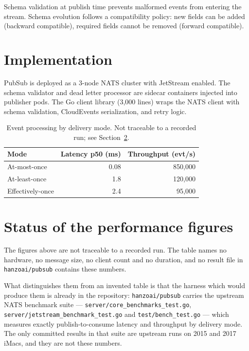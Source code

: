\documentclass[11pt,twocolumn]{article}
\begin{document}
Schema validation at publish time prevents malformed events from entering the stream. Schema evolution follows a compatibility policy: new fields can be added (backward compatible), required fields cannot be removed (forward compatible).

\section{Implementation}

PubSub is deployed as a 3-node NATS cluster with JetStream enabled. The schema validator and dead letter processor are sidecar containers injected into publisher pods. The Go client library (3,000 lines) wraps the NATS client with schema validation, CloudEvents serialization, and retry logic.

\begin{table}[h]
\centering
\caption{Event processing by delivery mode. Not traceable to a recorded run; see Section~\ref{sec:figures}.}
\label{tab:pubsub-perf}
\begin{tabular}{lrr}
\toprule
\textbf{Mode} & \textbf{Latency p50 (ms)} & \textbf{Throughput (evt/s)} \\
\midrule
At-most-once & 0.08 & 850,000 \\
At-least-once & 1.8 & 120,000 \\
Effectively-once & 2.4 & 95,000 \\
\bottomrule
\end{tabular}
\end{table}

\section{Status of the performance figures}
\label{sec:figures}

The figures above are not traceable to a recorded run. The table names no
hardware, no message size, no client count and no duration, and no result file
in \texttt{hanzoai/pubsub} contains these numbers.

What distinguishes them from an invented table is that the harness which would
produce them is already in the repository: \texttt{hanzoai/pubsub} carries the
upstream NATS benchmark suite --- \texttt{server/core\_benchmarks\_test.go},
\texttt{server/jetstream\_benchmark\_test.go} and \texttt{test/bench\_test.go} ---
which measures exactly publish-to-consume latency and throughput by delivery
mode. The only committed results in that suite are upstream runs on 2015 and
2017 iMacs, and they are not these numbers.
\end{document}
